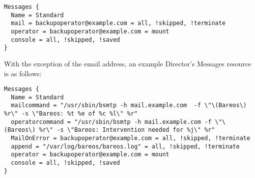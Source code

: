 \footnotesize
\begin{verbatim}
Messages {
  Name = Standard
  mail = backupoperator@example.com = all, !skipped, !terminate
  operator = backupoperator@example.com = mount
  console = all, !skipped, !saved
}
\end{verbatim}
\normalsize

With the exception of the email address,
an example Director's Messages resource is as follows:

\footnotesize
\begin{verbatim}
Messages {
  Name = Standard
  mailcommand = "/usr/sbin/bsmtp -h mail.example.com  -f \"\(Bareos\) %r\" -s \"Bareos: %t %e of %c %l\" %r"
  operatorcommand = "/usr/sbin/bsmtp -h mail.example.com -f \"\(Bareos\) %r\" -s \"Bareos: Intervention needed for %j\" %r"
  MailOnError = backupoperator@example.com = all, !skipped, !terminate
  append = "/var/log/bareos/bareos.log" = all, !skipped, !terminate
  operator = backupoperator@example.com = mount
  console = all, !skipped, !saved
}
\end{verbatim}
\normalsize

